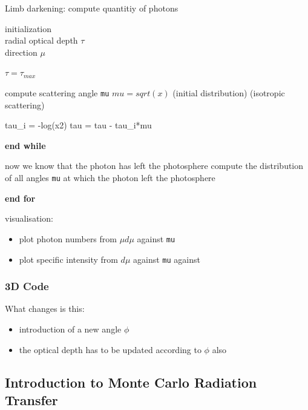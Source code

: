 \documentclass[10pt,a4paper]{article}
\begin{document}
\begin{algorithm}
\caption{Limb darkening: compute quantitiy of photons}\label{limb_darkening}
\begin{algorithmic}
\State initialization \\
\quad radial optical depth $\tau$ \\
\quad direction $\mu$


\State $\boxed{\tau = \tau_{max}}$
	
	\State compute scattering angle \texttt{mu}
	 $\boxed{mu = sqrt(x)}$ (initial distribution)
	 (isotropic scattering)
	\EndIf
	
	\State tau\_i = -log(x2) 
	\State tau = tau - tau\_i*mu	
		
	\EndWhile
	\State \textbf{end while}

	\State now we know that the photon has left the photosphere	
	\State compute the distribution of all angles \texttt{mu} at which the photon left the photosphere
	
\EndFor
\State \textbf{end for}

\State visualisation: 
	\begin{itemize}
	\item plot photon numbers from $\mu d\mu$ against \texttt{mu}
	\item plot specific intensity from $d\mu$ against \texttt{mu} against 
	\end{itemize}


\end{algorithmic}
\end{algorithm}


\subsubsection{3D Code}
What changes is this: 
\begin{itemize}
\item introduction of a new angle $\phi$
\item the optical depth has to be updated according to $\phi$ also
\end{itemize}


\newpage
\subsection{Introduction to Monte Carlo Radiation Transfer}
\end{document}
